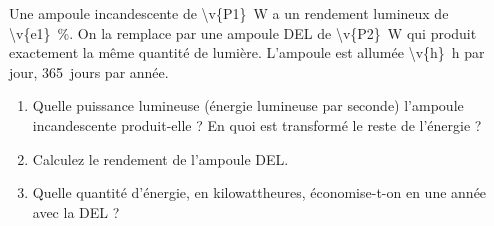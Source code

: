 Une ampoule incandescente de \qty{\v{P1}}{W} a un rendement lumineux de \qty{\v{e1}}{\percent}. On la remplace par une ampoule DEL de \qty{\v{P2}}{W} qui produit exactement la même quantité de lumière. L'ampoule est allumée \qty{\v{h}}{h} par jour, \qty{365}{jours} par année.

\begin{enumerate}[label=\alph*)]
    \item Quelle puissance lumineuse (énergie lumineuse par seconde) l'ampoule incandescente produit-elle ? En quoi est transformé le reste de l'énergie ?
    \item Calculez le rendement de l'ampoule DEL.
    \item Quelle quantité d'énergie, en kilowattheures, économise-t-on en une année avec la DEL ?
\end{enumerate}
